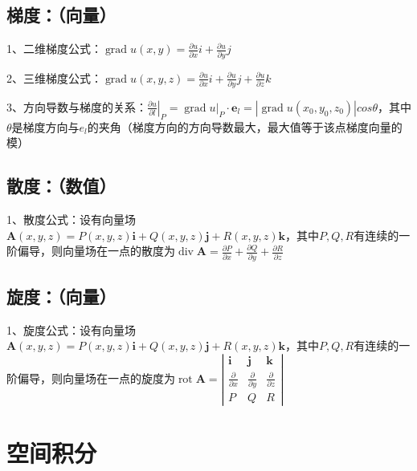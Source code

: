 \subsection{梯度：（向量）}

1、二维梯度公式：$ \operatorname{grad} u(x, y)=\frac{\partial u}{\partial x} i+\frac{\partial u}{\partial y} j $

2、三维梯度公式：$ \operatorname{grad} u(x, y, z)=\frac{\partial u}{\partial x} i+\frac{\partial u}{\partial y} j+\frac{\partial u}{\partial z} k $

3、方向导数与梯度的关系：$ \left.\frac{\partial u}{\partial{l}}\right|_{P}=\left.\operatorname{grad} u\right|_{P} \cdot \boldsymbol{e}_{l}=|\operatorname{grad} u(x_0, y_0, z_0) |cos \theta $，其中$ \theta $是梯度方向与$ e_l $的夹角（梯度方向的方向导数最大，最大值等于该点梯度向量的模）



\subsection{散度：（数值）}

1、散度公式：设有向量场$ \boldsymbol{A}(x, y, z)=P(x, y, z) \boldsymbol{i}+Q(x, y, z) \boldsymbol{j}+R(x, y, z) \boldsymbol{k} $，其中$ P,Q,R $有连续的一阶偏导，则向量场在一点的散度为$ \operatorname{div} \boldsymbol{A}=\frac{\partial P}{\partial x}+\frac{\partial Q}{\partial y}+\frac{\partial R}{\partial z} $



\subsection{旋度：（向量）}

1、旋度公式：设有向量场$ \boldsymbol{A}(x, y, z)=P(x, y, z) \boldsymbol{i}+Q(x, y, z) \boldsymbol{j}+R(x, y, z) \boldsymbol{k} $，其中$ P,Q,R $有连续的一阶偏导，则向量场在一点的旋度为$ \operatorname{rot} \boldsymbol{A}=\left|\begin{array}{ccc}\boldsymbol{i} & \boldsymbol{j} & \boldsymbol{k} \\\frac{\partial}{\partial x} & \frac{\partial}{\partial y} & \frac{\partial}{\partial z} \\P & Q & R\end{array}\right| $

\section{空间积分}



